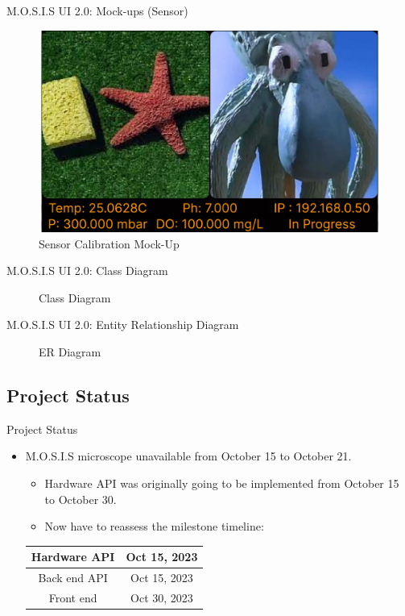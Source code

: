 \documentclass[17pt, aspectratio=169]{beamer}
\begin{document}
\begin{frame}{M.O.S.I.S UI 2.0: Mock-ups (Sensor)}
	\begin{figure}
		\includegraphics[page=7,height=0.65\textheight]{../../Progress_Report_Document/Appendix/Design_Documentation/User_Interface/Figures/M.O.S.I.S_UI_Design.pdf}
		\caption{Sensor Calibration Mock-Up}
	\end{figure}
\end{frame}
\begin{frame}{M.O.S.I.S UI 2.0: Class Diagram}
	\begin{figure}
		\caption{Class Diagram}
	\end{figure}
\end{frame}
\begin{frame}{M.O.S.I.S UI 2.0: Entity Relationship Diagram}
	\begin{figure}
		\caption{ER Diagram}
	\end{figure}
\end{frame}
\subsection{Project Status}
\begin{frame}{Project Status}
	\begin{itemize}
		\item M.O.S.I.S microscope unavailable from October 15 to October 21.
		      \begin{itemize}
			      \item Hardware API was originally going to be implemented from October 15 to October 30.
			      \item Now have to reassess the milestone timeline:
		      \end{itemize}
		      \begin{center}
			      \begin{tabular}{||c | c||}
				      \hline
				      Hardware API & Oct 15, 2023 \\
				      \hline
				      Back end API & Oct 15, 2023 \\
				      \hline
				      Front end    & Oct 30, 2023 \\
				      \hline
			      \end{tabular}
		      \end{center}
	\end{itemize}
\end{frame}
\end{document}
